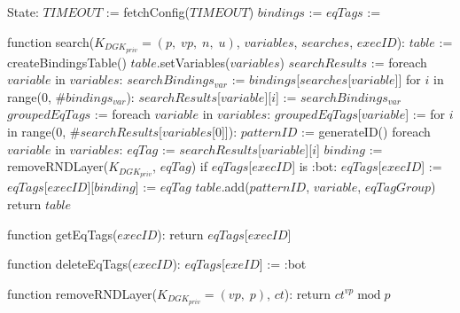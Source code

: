 State:
    $TIMEOUT$ := fetchConfig($TIMEOUT$)
    $bindings$ := {}
    $eqTags$ := {}

function search($K_{DGK_{priv}} = (p, \; vp, \; n, \; u)$, $variables$, $searches$, $execID$):
    $table$ := createBindingsTable()
    $table$.setVariables($variables$)
    $searchResults$ := {}
    foreach $variable$ in $variables$:
        $searchBindings_{var}$ := $bindings$[$searches$[$variable$]]
        for $i$ in range(0, $\#bindings_{var}$):
            $searchResults$[$variable$][$i$] := $searchBindings_{var}$
    $groupedEqTags$ := {}
    foreach $variable$ in $variables$:
        $groupedEqTags$[$variable$] := {}
    for $i$ in range(0, $\#searchResults$[$variables$[0]]):
        $patternID$ := generateID()
        foreach $variable$ in $variables$:
            $eqTag$ := $searchResults$[$variable$][$i$]
            $binding$ := removeRNDLayer($K_{DGK_{priv}}$, $eqTag$)
            if $eqTags$[$execID$] is :bot:
                $eqTags$[$execID$] := {}
            $eqTags$[$execID$][$binding$] := $eqTag$
            $table$.add($patternID$, $variable$, $eqTagGroup$)
    return $table$

function getEqTags($execID$):  
    return $eqTags$[$execID$]

function deleteEqTags($execID$):
    $eqTags$[$exeID$] := :bot

function removeRNDLayer($K_{DGK_{priv}} = (vp, \; p)$, $ct$):
    return $ct^{vp} \; \textrm{mod} \; p$